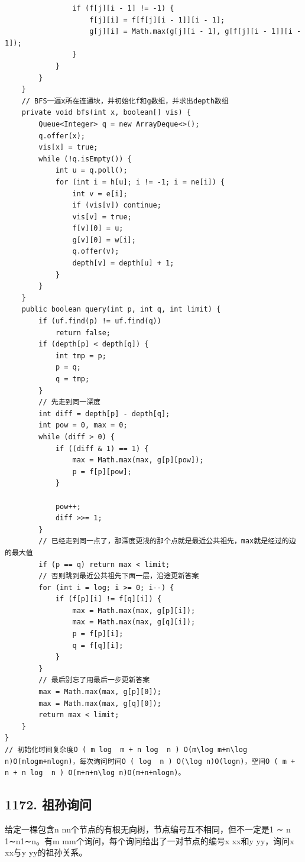 \documentclass[9pt, b5paper]{article}
\begin{document}
\begin{verbatim}
                if (f[j][i - 1] != -1) {
                    f[j][i] = f[f[j][i - 1]][i - 1];
                    g[j][i] = Math.max(g[j][i - 1], g[f[j][i - 1]][i - 1]);
                }
            }
        }
    }
    // BFS一遍x所在连通块，并初始化f和g数组，并求出depth数组
    private void bfs(int x, boolean[] vis) {
        Queue<Integer> q = new ArrayDeque<>();
        q.offer(x);
        vis[x] = true;
        while (!q.isEmpty()) {
            int u = q.poll();
            for (int i = h[u]; i != -1; i = ne[i]) {
                int v = e[i];
                if (vis[v]) continue;
                vis[v] = true;
                f[v][0] = u;
                g[v][0] = w[i];
                q.offer(v);
                depth[v] = depth[u] + 1;
            }
        }
    }
    public boolean query(int p, int q, int limit) {
        if (uf.find(p) != uf.find(q)) 
            return false;
        if (depth[p] < depth[q]) {
            int tmp = p;
            p = q;
            q = tmp;
        }
        // 先走到同一深度
        int diff = depth[p] - depth[q];
        int pow = 0, max = 0;
        while (diff > 0) {
            if ((diff & 1) == 1) {
                max = Math.max(max, g[p][pow]);
                p = f[p][pow];
            }

            pow++;
            diff >>= 1;
        }
        // 已经走到同一点了，那深度更浅的那个点就是最近公共祖先，max就是经过的边的最大值
        if (p == q) return max < limit;
        // 否则跳到最近公共祖先下面一层，沿途更新答案
        for (int i = log; i >= 0; i--) {
            if (f[p][i] != f[q][i]) {
                max = Math.max(max, g[p][i]);
                max = Math.max(max, g[q][i]);
                p = f[p][i];
                q = f[q][i];
            }
        }
        // 最后别忘了用最后一步更新答案
        max = Math.max(max, g[p][0]);
        max = Math.max(max, g[q][0]);
        return max < limit;
    }
}
// 初始化时间复杂度O ( m log ⁡ m + n log ⁡ n ) O(m\log m+n\log n)O(mlogm+nlogn)，每次询问时间O ( log ⁡ n ) O(\log n)O(logn)，空间O ( m + n + n log ⁡ n ) O(m+n+n\log n)O(m+n+nlogn)。
\end{verbatim}

\subsection{1172. 祖孙询问}
\label{sec-11-7}
给定一棵包含n nn个节点的有根无向树，节点编号互不相同，但不一定是1 ∼ n 1∼n1∼n。有m mm个询问，每个询问给出了一对节点的编号x xx和y yy，询问x xx与y yy的祖孙关系。
\end{document}
